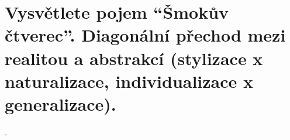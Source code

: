 \section{Vysvětlete pojem \enquote{Šmokův čtverec}. Diagonální přechod mezi realitou a abstrakcí 
(stylizace x naturalizace, individualizace x generalizace).}.